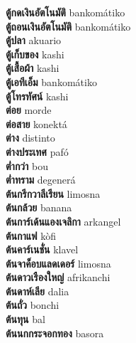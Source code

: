 \textbf{ ตู้กดเงินอัตโนมัติ  } bankomátiko \\
\textbf{ ตู้ถอนเงินอัตโนมัติ  } bankomátiko \\
\textbf{ ตู้ปลา  } akuario \\
\textbf{ ตู้เก็บของ  } kashi \\
\textbf{ ตู้เสื้อผ้า  } kashi \\
\textbf{ ตู้เอทีเอ็ม  } bankomátiko \\
\textbf{ ตู้โทรทัศน์  } kashi \\
\textbf{ ต่อย  } morde \\
\textbf{ ต่อสาย  } konektá \\
\textbf{ ต่าง  } distinto \\
\textbf{ ต่างประเทศ  } pafó \\
\textbf{ ต่ำกว่า  } bou \\
\textbf{ ต่ำทราม  } degenerá \\
\textbf{ ต้นกรีกวาลีเรียน  } limosna \\
\textbf{ ต้นกล้วย  } banana \\
\textbf{ ต้นการ์เด้นแองเจลิกา  } arkangel \\
\textbf{ ต้นกาแฟ  } kòfi \\
\textbf{ ต้นคาร์เนชั่น  } klavel \\
\textbf{ ต้นจาค็อบแลดเดอร์  } limosna \\
\textbf{ ต้นดาวเรืองใหญ่  } afrikanchi \\
\textbf{ ต้นดาห์เลีย  } dalia \\
\textbf{ ต้นถั่ว  } bonchi \\
\textbf{ ต้นทุน  } bal \\
\textbf{ ต้นนกกระจอกทอง  } basora \\

